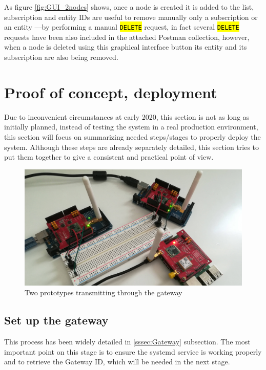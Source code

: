 \documentclass[11pt,a4paper,dvipsnames,twoside]{article}
\newcommand{\cmd}[1] {\hl{\texttt{#1}}}
\begin{document}
As figure \ref{fig:GUI_2nodes} shows, once a node is created it is added to the list, subscription and entity IDs are useful to remove manually only a subscription or an entity ---by performing a manual \cmd{DELETE} request, in fact several \cmd{DELETE} requests have been also included in the attached Postman collection, however, when a node is deleted using this graphical interface button its entity and its subscription are also being removed.

\clearpage{\pagestyle{empty}\cleardoublepage}\thispagestyle{plain}  %
\section{Proof of concept, deployment}
Due to inconvenient circumstances at early 2020, this section is not as long as initially planned, instead of testing the system in a real production environment, this section will focus on summarizing needed steps/stages to properly deploy the system. Although these steps are already separately detailed, this section tries to put them together to give a consistent and practical point of view.

\begin{figure}[ht]
  \centering
  \includegraphics[width=.9\textwidth]{../pictures/2prototypes_1gateway.jpg}  
  \caption{Two prototypes transmitting through the gateway}
  \label{fig:2nodes_gateway}
\end{figure}

\subsection{Set up the gateway}
This process has been widely detailed in \ref{sssec:Gateway} subsection. The most important point on this stage is to ensure the systemd service is working properly and to retrieve the Gateway ID, which will be needed in the next stage.
\end{document}
